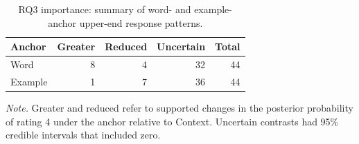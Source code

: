 \begin{table}[tbp]
\caption{RQ3 importance: summary of word- and example-anchor upper-end response patterns.}
\label{tab:rq3_importance_upper_end_summary}
\begin{tabular}{lrrrr}
\toprule
Anchor & Greater & Reduced & Uncertain & Total \\
\midrule
Word & 8 & 4 & 32 & 44 \\
Example & 1 & 7 & 36 & 44 \\
\bottomrule
\end{tabular}
\vspace{2pt}
\begin{minipage}{\linewidth}
\footnotesize\textit{Note.} Greater and reduced refer to supported changes in the posterior probability of rating 4 under the anchor relative to Context. Uncertain contrasts had 95\% credible intervals that included zero.
\end{minipage}
\end{table}
